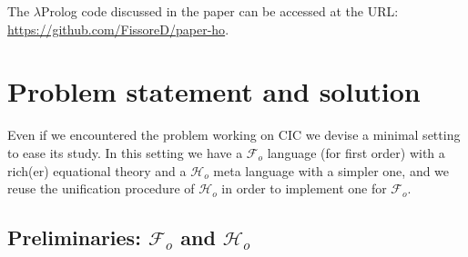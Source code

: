 \documentclass[sigconf,natbib=false,review]{acmart}
\newcommand{\llambda}{\ensuremath{\mathcal{L}_\lambda}\xspace}
\newcommand{\Fo}{\ensuremath{\mathcal{F}_{\!o}\xspace}} %
\newcommand{\Ho}{\ensuremath{\mathcal{H}_o}\xspace}
\begin{document}
The $\lambda$Prolog code discussed in the paper can be accessed at the
URL: \url{https://github.com/FissoreD/paper-ho}.

\section{Problem statement and solution} %
\label{sec:problem-statement}

\newcommand{\specunif}[3]{
  \{#3_1, #3_2\} \subseteq \llambda \Rightarrow %
    \exists \rho, %
      \rho #3_1 #1 \rho #3_2  %
        \Leftrightarrow #3_1 #2 #3_2 \mapsto \rho' \subseteq \rho
}


\newcommand{\unifcorrect}[3]{
    \{#3_1, #3_2\} \subseteq \llambda \Rightarrow
      #3_1 #2 #3_2 \mapsto \rho
        \Rightarrow
          \rho #3_1 #1 \rho #3_2  %
}

\newcommand{\unifcomplete}[3]{
    \{#3_1, #3_2\} \subseteq \llambda \Rightarrow
        \rho #3_1 #1 \rho #3_2  %
          \Rightarrow \exists \rho', #3_1 #2 #3_2 \mapsto \rho' \land \rho' \subseteq \rho
}
\newcommand{\maybeeta}{\ensuremath{\Diamond\eta}\xspace}
\newcommand{\maybebeta}{\ensuremath{\Diamond\beta_0}\xspace}
\newcommand{\notllambda}{\ensuremath{\Diamond\llambda}\xspace}

Even if we encountered the problem working on CIC we devise
a minimal setting to ease its study. In this setting we have
a \Fo{} language (for first order) with a rich(er) equational
theory and a \Ho{} meta language with a simpler one, and we reuse
the unification procedure of \Ho{} in order to implement one for \Fo.


\subsection{Preliminaries: \Fo{} and \Ho{}}
\end{document}
